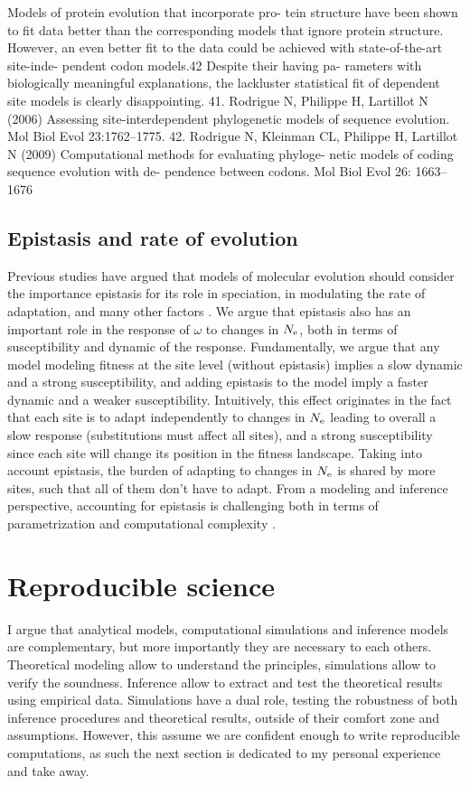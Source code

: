 Models of protein evolution that incorporate pro-
tein structure have been shown to fit data better than the corresponding models that ignore protein structure. However, an even better fit to the data could be achieved with state-of-the-art site-inde- pendent codon models.42 Despite their having pa- rameters with biologically meaningful explanations, the lackluster statistical fit of dependent site models is clearly disappointing.
41. Rodrigue N, Philippe H, Lartillot N (2006) Assessing site-interdependent phylogenetic models of sequence evolution. Mol Biol Evol 23:1762–1775.
42. Rodrigue N, Kleinman CL, Philippe H, Lartillot N (2009) Computational methods for evaluating phyloge- netic models of coding sequence evolution with de- pendence between codons. Mol Biol Evol 26: 1663–1676

\subsection{Epistasis and rate of evolution}

Previous studies have argued that models of molecular evolution should consider the importance epistasis for its role in speciation, in modulating the rate of adaptation, and many other factors \citet{Goldstein2017, Miller2018}.
We argue that epistasis also has an important role in the response of $\omega$ to changes in $N_{\textrm{e}}$, both in terms of susceptibility and dynamic of the response.
Fundamentally, we argue that any model modeling fitness at the site level (without epistasis) implies a slow dynamic and a strong susceptibility, and adding epistasis to the model imply a faster dynamic and a weaker susceptibility.
Intuitively, this effect originates in the fact that each site is to adapt independently to changes in $N_{\textrm{e}}$ leading to overall a slow response (substitutions must affect all sites), and a strong susceptibility since each site will change its position in the fitness landscape.
Taking into account epistasis, the burden of adapting to changes in $N_{\textrm{e}}$ is shared by more sites, such that all of them don't have to adapt. 
From a modeling and inference perspective, accounting for epistasis is challenging both in terms of parametrization and computational complexity \citet{Rodrigue2005, Manhart2014}. 


\section{Reproducible science}
I argue that analytical models, computational simulations and inference models are complementary, but more importantly they are necessary to each others. 
Theoretical modeling allow to understand the principles, simulations allow to verify the soundness.
Inference allow to extract and test the theoretical results using empirical data.
Simulations have a dual role, testing the robustness of both inference procedures and theoretical results, outside of their comfort zone and assumptions.
However, this assume we are confident enough to write reproducible computations, as such the next section is dedicated to my personal experience and take away.

